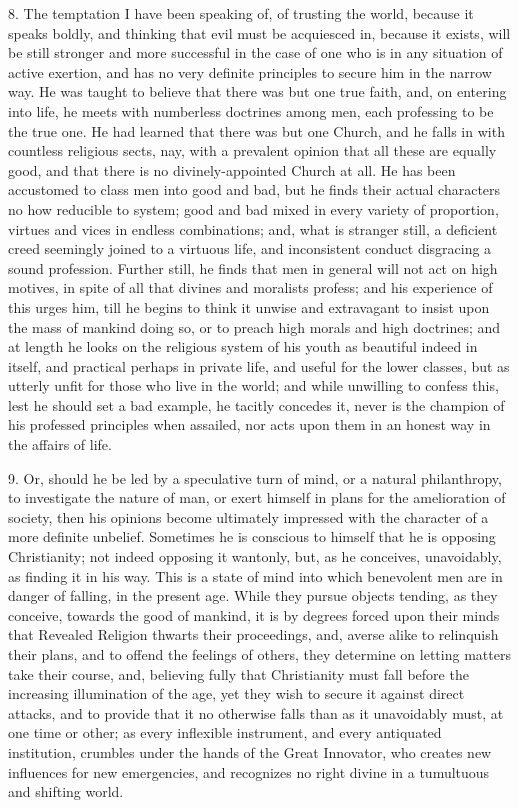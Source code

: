 8. The temptation I have been speaking of, of trusting the world,
because it speaks boldly, and thinking that evil must be acquiesced
in, because it exists, will be still stronger and more successful in
the case of one who is in any situation of active exertion, and has no
very definite principles to secure him in the narrow way. He was
taught to believe that there was but one true faith, and, on entering
into life, he meets with numberless doctrines among men, each
professing to be the true one. He had learned that there was but one
Church, and he falls in with countless religious sects, nay, with a
prevalent opinion that all these are equally good, and that there is
no divinely-appointed Church at all. He has been accustomed to class
men into good and bad, but he finds their actual characters no how
reducible to system; good and bad mixed in every variety of
proportion, virtues and vices in endless combinations; and, what is
stranger still, a deficient creed seemingly joined to a virtuous life,
and inconsistent conduct disgracing a sound profession. Further still,
he finds that men in general will not act on high motives, in spite of
all that divines and moralists profess; and his experience of this
urges him, till he begins to think it unwise and extravagant to insist
upon the mass of mankind doing so, or to preach high morals and high
doctrines; and at length he looks on the religious system of his youth
as beautiful indeed in itself, and practical perhaps in private life,
and useful for the lower classes, but as utterly unfit for those who
live in the world; and while unwilling to confess this, lest he should
set a bad example, he tacitly concedes it, never is the champion of
his professed principles when assailed, nor acts upon them in an
honest way in the affairs of life.

9. Or, should he be led by a speculative turn of mind, or a natural
philanthropy, to investigate the nature of man, or exert himself in
plans for the amelioration of society, then his opinions become
ultimately impressed with the character of a more definite unbelief.
Sometimes he is conscious to himself that he is opposing Christianity;
not indeed opposing it wantonly, but, as he conceives, unavoidably, as
finding it in his way. This is a state of mind into which benevolent
men are in danger of falling, in the present age. While they pursue
objects tending, as they conceive, towards the good of mankind, it is
by degrees forced upon their minds that Revealed Religion thwarts
their proceedings, and, averse alike to relinquish their plans, and to
offend the feelings of others, they determine on letting matters take
their course, and, believing fully that Christianity must fall before
the increasing illumination of the age, yet they wish to secure it
against direct attacks, and to provide that it no otherwise falls than
as it unavoidably must, at one time or other; as every inflexible
instrument, and every antiquated institution, crumbles under the hands
of the Great Innovator, who creates new influences for new
emergencies, and recognizes no right divine in a tumultuous and
shifting world.

